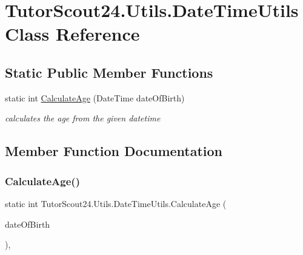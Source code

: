 \hypertarget{class_tutor_scout24_1_1_utils_1_1_date_time_utils}{}\section{Tutor\+Scout24.\+Utils.\+Date\+Time\+Utils Class Reference}
\label{class_tutor_scout24_1_1_utils_1_1_date_time_utils}
\subsection*{Static Public Member Functions}
\begin{DoxyCompactItemize}
\item 
static int \mbox{\hyperlink{class_tutor_scout24_1_1_utils_1_1_date_time_utils_a5ccae0270ef17e43d8b4c99109fe2db4}{Calculate\+Age}} (Date\+Time date\+Of\+Birth)
\begin{DoxyCompactList}\small\item\em calculates the age from the given datetime \end{DoxyCompactList}\end{DoxyCompactItemize}


\subsection{Member Function Documentation}
\mbox{\label{class_tutor_scout24_1_1_utils_1_1_date_time_utils_a5ccae0270ef17e43d8b4c99109fe2db4}} 
\subsubsection{\texorpdfstring{Calculate\+Age()}{CalculateAge()}}
{\footnotesize\ttfamily static int Tutor\+Scout24.\+Utils.\+Date\+Time\+Utils.\+Calculate\+Age (\begin{DoxyParamCaption}\item[{Date\+Time}]{date\+Of\+Birth }\end{DoxyParamCaption})\hspace{0.3cm}{\ttfamily [inline]}, {\ttfamily [static]}}



